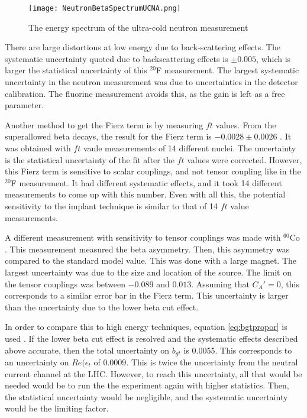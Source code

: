 \documentclass[main.tex]{subfiles}
\begin{document}
\begin{figure}[!htb]
	\centerline{\texttt{[image: NeutronBetaSpectrumUCNA.png]}}
	\caption{The energy spectrum of the ultra-cold neutron measurement \cite{Hic17}}
	\label{fig:ucnabeta}
\end{figure}

There are large distortions at low energy due to back-scattering effects. 
The systematic uncertainty quoted due to backscattering effects is $\pm 0.005$, which is larger the statistical uncertainty of this $^{20}$F measurement.
The largest systematic uncertainty in the neutron measurement was due to uncertainties in the detector calibration.
The fluorine measurement avoids this, as the gain is left as a free parameter.

Another method to get the Fierz term is by measuring $ft$ values.
From the superallowed beta decays, the result for the Fierz term is $-0.0028 \pm 0.0026$ \cite{Har17}.
It was obtained with $ft$ vaule measurements of 14 different nuclei. 
The uncertainty is the statistical uncertainty of the fit after the $ft$ values were corrected.
However, this Fierz term is sensitive to scalar couplings, and not tensor coupling like in the $^{20}$F measurement.
It had different systematic effects, and it took 14 different measurements to come up with this number.
Even with all this, the potential sensitivity to the implant technique is similar to that of 14 $ft$ value measurements.

A different measurement with sensitivity to tensor couplings was made with $^{60}$Co \cite{Wau10}.
This measurement measured the beta asymmetry.
Then, this asymmetry was compared to the standard model value.
This was done with a large magnet. 
The largest uncertainty was due to the size and location of the source.
The limit on the tensor couplings was between $-0.089$ and $0.013$.
Assuming that $C_{A}' = 0$, this corresponds to a similar error bar in the Fierz term.
This uncertainty is larger than the uncertainty due to the lower beta cut effect.

In order to compare this to high energy techniques, equation \ref{eq:bgtpropor} is used \cite{Gon19}.
If the lower beta cut effect is resolved and the systematic effects described above accurate, then the total uncertainty on $b_{gt}$ is 0.0055. 
This corresponds to an uncertainty on $Re(\epsilon_{t}$ of 0.0009.
This is twice the uncertainty from the neutral current channel at the LHC. 
However, to reach this uncertainty, all that would be needed would be to run the the experiment again with higher statistics. 
Then, the statistical uncertainty would be negligible, and the systematic uncertainty would be the limiting factor. 
\end{document}
